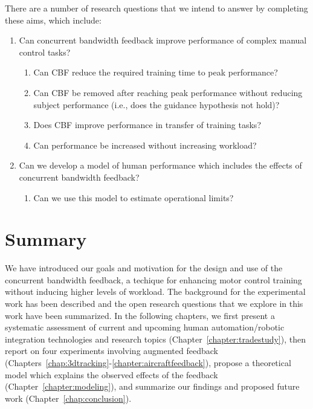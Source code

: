 There are a number of research questions that we intend to answer by completing these aims, which include:
\begin{enumerate}
    \item Can concurrent bandwidth feedback improve performance of complex manual control tasks?
          \begin{enumerate}
              \item Can CBF reduce the required training time to peak performance?
              \item Can CBF be removed after reaching peak performance without reducing subject performance (i.e., does the guidance hypothesis not hold)?
              \item Does CBF improve performance in transfer of training tasks?
              \item Can performance be increased without increasing workload?
          \end{enumerate}
    \item Can we develop a model of human performance which includes the effects of concurrent bandwidth feedback?
          \begin{enumerate}
              \item Can we use this model to estimate operational limits?
          \end{enumerate}
\end{enumerate}

\section{Summary}
We have introduced our goals and motivation for the design and use of the concurrent bandwidth feedback, a techique for enhancing motor control training without inducing higher levels of workload.
The background for the experimental work has been described and the open research questions that we explore in this work have been summarized.
In the following chapters, we first present a systematic assessment of current and upcoming human automation/robotic integration technologies and research topics (Chapter~\ref{chapter:tradestudy}), then report on four experiments involving augmented feedback (Chapters~\ref{chap:3dtracking}-\ref{chapter:aircraftfeedback}), propose a theoretical model which explains the observed effects of the feedback (Chapter~\ref{chapter:modeling}), and summarize our findings and proposed future work (Chapter~\ref{chap:conclusion}).
